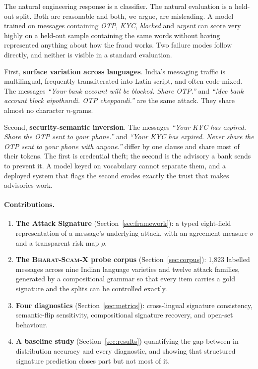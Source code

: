 \documentclass[11pt,a4paper]{article}
\newcommand{\sig}{\ensuremath{\sigma}}
\newcommand{\bsx}{\textsc{Bharat-Scam-X}}
\begin{document}
The natural engineering response is a classifier. The natural evaluation is a
held-out split. Both are reasonable and both, we argue, are misleading. A model
trained on messages containing \emph{OTP}, \emph{KYC}, \emph{blocked} and
\emph{urgent} can score very highly on a held-out sample containing the same
words without having represented anything about how the fraud works. Two
failure modes follow directly, and neither is visible in a standard evaluation.

First, \textbf{surface variation across languages}. India's messaging traffic is
multilingual, frequently transliterated into Latin script, and often code-mixed.
The messages \emph{``Your bank account will be blocked. Share OTP.''} and
\emph{``Mee bank account block aipothundi. OTP cheppandi.''} are the same attack.
They share almost no character $n$-grams.

Second, \textbf{security-semantic inversion}. The messages
\emph{``Your KYC has expired. Share the OTP sent to your phone.''} and
\emph{``Your KYC has expired. Never share the OTP sent to your phone with
anyone.''} differ by one clause and share most of their tokens. The first is
credential theft; the second is the advisory a bank sends to prevent it. A model
keyed on vocabulary cannot separate them, and a deployed system that flags the
second erodes exactly the trust that makes advisories work.

\paragraph{Contributions.}
\begin{enumerate}[leftmargin=1.4em,itemsep=2pt,topsep=3pt]
  \item \textbf{The Attack Signature} (Section~\ref{sec:framework}): a typed
        eight-field representation of a message's underlying attack, with an
        agreement measure \sig{} and a transparent risk map $\rho$.
  \item \textbf{The \bsx{} probe corpus} (Section~\ref{sec:corpus}): 1{,}823
        labelled messages across nine Indian language varieties and twelve
        attack families, generated by a compositional grammar so that every item
        carries a gold signature and the splits can be controlled exactly.
  \item \textbf{Four diagnostics} (Section~\ref{sec:metrics}): cross-lingual
        signature consistency, semantic-flip sensitivity, compositional
        signature recovery, and open-set behaviour.
  \item \textbf{A baseline study} (Section~\ref{sec:results}) quantifying the
        gap between in-distribution accuracy and every diagnostic, and showing
        that structured signature prediction closes part but not most of it.
\end{enumerate}
\end{document}
